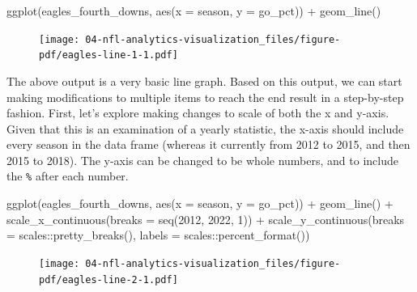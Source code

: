 \documentclass[
  letterpaper,
]{krantz}
\newenvironment{Shaded}{\begin{snugshade}}{\end{snugshade}}
\newcommand{\AttributeTok}[1]{\textcolor[rgb]{0.40,0.45,0.13}{#1}}
\newcommand{\DecValTok}[1]{\textcolor[rgb]{0.68,0.00,0.00}{#1}}
\newcommand{\FunctionTok}[1]{\textcolor[rgb]{0.28,0.35,0.67}{#1}}
\newcommand{\NormalTok}[1]{\textcolor[rgb]{0.00,0.23,0.31}{#1}}
\newcommand{\SpecialCharTok}[1]{\textcolor[rgb]{0.37,0.37,0.37}{#1}}
\begin{document}
\begin{Shaded}
\begin{Highlighting}[]
\FunctionTok{ggplot}\NormalTok{(eagles\_fourth\_downs, }\FunctionTok{aes}\NormalTok{(}\AttributeTok{x =}\NormalTok{ season, }\AttributeTok{y =}\NormalTok{ go\_pct)) }\SpecialCharTok{+}
  \FunctionTok{geom\_line}\NormalTok{()}
\end{Highlighting}
\end{Shaded}

\begin{figure}[H]

{\centering \texttt{[image: 04-nfl-analytics-visualization\_files/figure-pdf/eagles-line-1-1.pdf]}

}

\end{figure}

The above output is a very basic line graph. Based on this output, we
can start making modifications to multiple items to reach the end result
in a step-by-step fashion. First, let's explore making changes to scale
of both the x and y-axis. Given that this is an examination of a yearly
statistic, the x-axis should include every season in the data frame
(whereas it currently from 2012 to 2015, and then 2015 to 2018). The
y-axis can be changed to be whole numbers, and to include the
\texttt{\%} after each number.

\begin{Shaded}
\begin{Highlighting}[]
\FunctionTok{ggplot}\NormalTok{(eagles\_fourth\_downs, }\FunctionTok{aes}\NormalTok{(}\AttributeTok{x =}\NormalTok{ season, }\AttributeTok{y =}\NormalTok{ go\_pct)) }\SpecialCharTok{+}
  \FunctionTok{geom\_line}\NormalTok{() }\SpecialCharTok{+}
  \FunctionTok{scale\_x\_continuous}\NormalTok{(}\AttributeTok{breaks =} \FunctionTok{seq}\NormalTok{(}\DecValTok{2012}\NormalTok{, }\DecValTok{2022}\NormalTok{, }\DecValTok{1}\NormalTok{)) }\SpecialCharTok{+}
  \FunctionTok{scale\_y\_continuous}\NormalTok{(}\AttributeTok{breaks =}\NormalTok{ scales}\SpecialCharTok{::}\FunctionTok{pretty\_breaks}\NormalTok{(),}
                     \AttributeTok{labels =}\NormalTok{ scales}\SpecialCharTok{::}\FunctionTok{percent\_format}\NormalTok{())}
\end{Highlighting}
\end{Shaded}

\begin{figure}[H]

{\centering \texttt{[image: 04-nfl-analytics-visualization\_files/figure-pdf/eagles-line-2-1.pdf]}

}

\end{figure}
\end{document}
